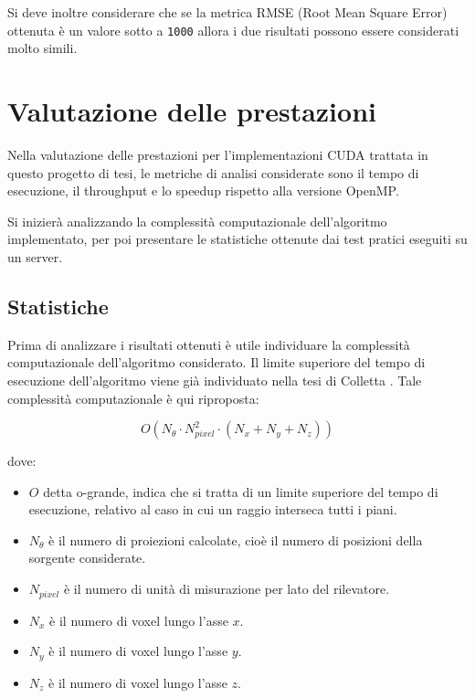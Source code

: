 \documentclass[12pt,a4paper]{report}
\begin{document}
Si deve inoltre considerare che se la metrica RMSE (Root Mean Square Error) ottenuta è un valore sotto a \lstinline{1000}
allora i due risultati possono essere considerati molto simili.

\chapter{Valutazione delle prestazioni}

Nella valutazione delle prestazioni per l'implementazioni CUDA trattata in questo progetto di tesi, le metriche di analisi
considerate sono il tempo di esecuzione, il throughput e lo speedup rispetto alla versione OpenMP.

Si inizierà analizzando la complessità computazionale dell'algoritmo implementato, per poi presentare le statistiche ottenute dai
test pratici eseguiti su un server.

\section{Statistiche}

Prima di analizzare i risultati ottenuti è utile individuare la complessità computazionale dell'algoritmo considerato.
Il limite superiore del tempo di esecuzione dell'algoritmo viene già individuato nella tesi di Colletta \cite{Colletta2024}.
Tale complessità computazionale è qui riproposta:

\begin{equation} \label{eq:computational_complexity}
  O(N_\theta \cdot N_{pixel}^2 \cdot (N_x + N_y + N_z))
\end{equation}

dove:
\begin{itemize}
  \item \(O\) detta o-grande, indica che si tratta di un limite superiore del tempo di esecuzione, relativo al caso in cui un
        raggio interseca tutti i piani.
  \item \(N_\theta\) è il numero di proiezioni calcolate, cioè il numero di posizioni della sorgente considerate.
  \item \(N_{pixel}\) è il numero di unità di misurazione per lato del rilevatore.
  \item \(N_x\) è il numero di voxel lungo l'asse \(x\).
  \item \(N_y\) è il numero di voxel lungo l'asse \(y\).
  \item \(N_z\) è il numero di voxel lungo l'asse \(z\).
\end{itemize}
\end{document}
